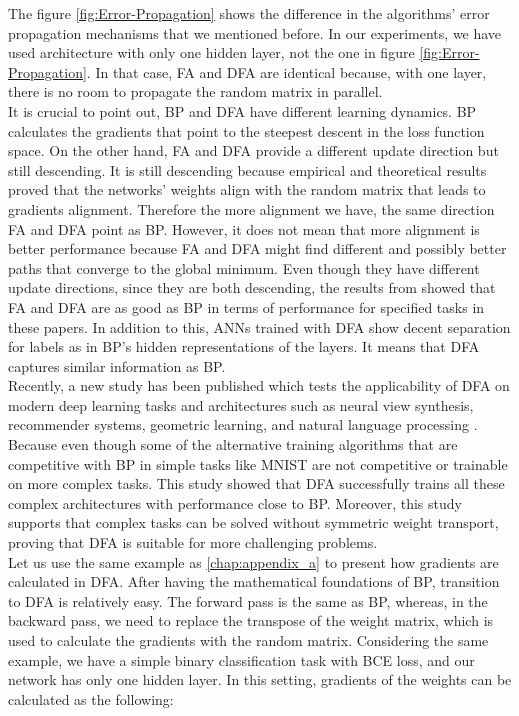 \documentclass[a4paper, nobind]{templates/ociamthesis}
\begin{document}
\noindent The figure \ref{fig:Error-Propagation} shows the difference in the algorithms' error propagation mechanisms that we mentioned before. In our experiments, we have used architecture with only one hidden layer, not the one in figure \ref{fig:Error-Propagation}. In that case, FA and DFA are identical because, with one layer, there is no room to propagate the random matrix in parallel.\\
It is crucial to point out, BP and DFA have different learning dynamics. BP calculates the gradients that point to the steepest descent in the loss function space. On the other hand, FA and DFA provide a different update direction but still descending. It is still descending because empirical and theoretical results proved that the networks' weights align with the random matrix that leads to gradients alignment. Therefore the more alignment we have, the same direction FA and DFA point as BP. However, it does not mean that more alignment is better performance because FA and DFA might find different and possibly better paths that converge to the global minimum. Even though they have different update directions, since they are both descending, the results from \cite{lillicrap2014random, nøkland2016direct} showed that FA and DFA are as good as BP in terms of performance for specified tasks in these papers. In addition to this, ANNs trained with DFA show decent separation for labels as in BP's hidden representations of the layers. It means that DFA captures similar information as BP.\\
Recently, a new study has been published which tests the applicability of DFA on modern deep learning tasks and architectures such as neural view synthesis, recommender systems, geometric learning, and natural language processing \cite{launay2020direct}. Because even though some of the alternative training algorithms that are competitive with BP in simple tasks like MNIST are not competitive or trainable on more complex tasks. This study showed that DFA successfully trains all these complex architectures with performance close to BP. Moreover, this study supports that complex tasks can be solved without symmetric weight transport, proving that DFA is suitable for more challenging problems.\\
Let us use the same example as \ref{chap:appendix_a} to present how gradients are calculated in DFA. After having the mathematical foundations of BP, transition to DFA is relatively easy. The forward pass is the same as BP, whereas, in the backward pass, we need to replace the transpose of the weight matrix, which is used to calculate the gradients with the random matrix. Considering the same example, we have a simple binary classification task with BCE loss, and our network has only one hidden layer. In this setting, gradients of the weights can be calculated as the following:
\end{document}
